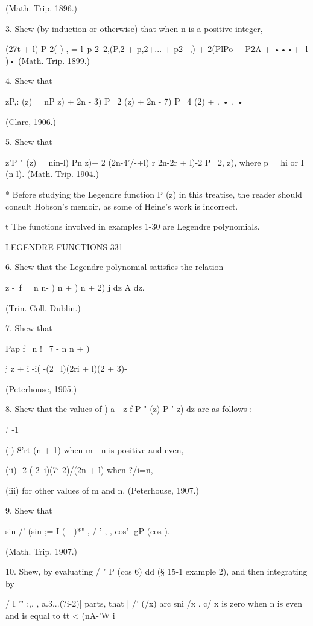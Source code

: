 {{{{(Math. Trip. 1896.) 

3. Shew (by induction or otherwise) that when n is a positive integer, 

(27t + l)  P 2( ) , = l\  p 2\ 2,(P,2 + p,2+... + p2 \ ,) + 2(PlPo + P2A + •••+  -l  )• 
(Math. Trip. 1899.) 

4. Shew that 

zP,: (z) = nP  z) +   2n - 3) P \  2 (z) +  2n - 7) P  \  4 (2) + . • . • 

(Clare, 1906.) 

5. Shew that 

z'P " (z) = nin-l) Pn z)+ 2 (2n-4'/-+l)  r 2n-2r + l)-2  P \ 2,  z), 
where p = hi or I (n-l). (Math. Trip. 1904.) 

* Before studying the Legendre function P  (z) in this treatise, the reader should consult 
Hobson's memoir, as some of Heine's work is incorrect. 

t The functions involved in examples 1-30 are Legendre polynomials. 



LEGENDRE FUNCTIONS 331 

6. Shew that the Legendre polynomial satisfies the relation 

 z -\ f  = n n- )  n +  )  n + 2) j dz  A dz. 

(Trin. Coll. Dublin.) 

7. Shew that 

Pap f \ n ! \ 7 - n n +  )  \  

j z    + i   -i(  -(2 \ l)(2ri + l)(2  + 3)- 

(Peterhouse, 1905.) 

8. Shew that the values of ) a - z f P " (z) P '  z) dz are as follows : 

.' -1 

(i) 8'rt (n + 1) when m - n is positive and even, 

(ii) -2 ( 2\ i)(7i-2)/(2n + l) when ?/i=n, 

(iii) for other values of m and n. (Peterhouse, 1907.) 

9. Shew that 

sin  /' (sin ;= I ( - )*" , /  ' , , cos'- gP  (cos  ). 

(Math. Trip. 1907.) 

10. Shew, by evaluating / " P  (cos 6) dd (§ 15-1 example 2), and then integrating by 

/ I '" :,. , a.3...(?i-2)]  
parts, that | /'  (/x) arc sni /x . c/ x is zero when n is even and is equal to tt <  (nA-'W i 

}}}}
